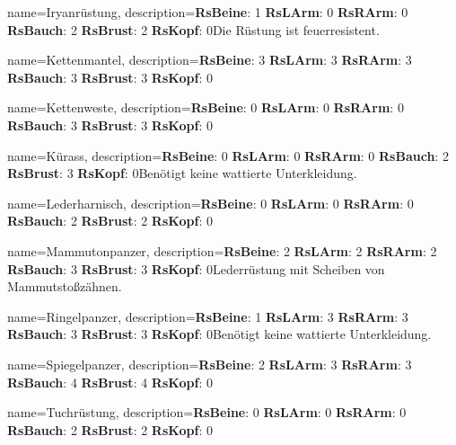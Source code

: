 {
    name={Iryanrüstung},
    description={\textbf{RsBeine}: 1 \textbf{RsLArm}: 0 \textbf{RsRArm}: 0 \textbf{RsBauch}: 2 \textbf{RsBrust}: 2 \textbf{RsKopf}: 0\newline Die Rüstung ist feuerresistent.}
}


{
    name={Kettenmantel},
    description={\textbf{RsBeine}: 3 \textbf{RsLArm}: 3 \textbf{RsRArm}: 3 \textbf{RsBauch}: 3 \textbf{RsBrust}: 3 \textbf{RsKopf}: 0\newline }
}


{
    name={Kettenweste},
    description={\textbf{RsBeine}: 0 \textbf{RsLArm}: 0 \textbf{RsRArm}: 0 \textbf{RsBauch}: 3 \textbf{RsBrust}: 3 \textbf{RsKopf}: 0\newline }
}


{
    name={Kürass},
    description={\textbf{RsBeine}: 0 \textbf{RsLArm}: 0 \textbf{RsRArm}: 0 \textbf{RsBauch}: 2 \textbf{RsBrust}: 3 \textbf{RsKopf}: 0\newline Benötigt keine wattierte Unterkleidung.}
}


{
    name={Lederharnisch},
    description={\textbf{RsBeine}: 0 \textbf{RsLArm}: 0 \textbf{RsRArm}: 0 \textbf{RsBauch}: 2 \textbf{RsBrust}: 2 \textbf{RsKopf}: 0\newline }
}


{
    name={Mammutonpanzer},
    description={\textbf{RsBeine}: 2 \textbf{RsLArm}: 2 \textbf{RsRArm}: 2 \textbf{RsBauch}: 3 \textbf{RsBrust}: 3 \textbf{RsKopf}: 0\newline Lederrüstung mit Scheiben von Mammutstoßzähnen.}
}


{
    name={Ringelpanzer},
    description={\textbf{RsBeine}: 1 \textbf{RsLArm}: 3 \textbf{RsRArm}: 3 \textbf{RsBauch}: 3 \textbf{RsBrust}: 3 \textbf{RsKopf}: 0\newline Benötigt keine wattierte Unterkleidung.}
}


{
    name={Spiegelpanzer},
    description={\textbf{RsBeine}: 2 \textbf{RsLArm}: 3 \textbf{RsRArm}: 3 \textbf{RsBauch}: 4 \textbf{RsBrust}: 4 \textbf{RsKopf}: 0\newline }
}


{
    name={Tuchrüstung},
    description={\textbf{RsBeine}: 0 \textbf{RsLArm}: 0 \textbf{RsRArm}: 0 \textbf{RsBauch}: 2 \textbf{RsBrust}: 2 \textbf{RsKopf}: 0\newline }
}



